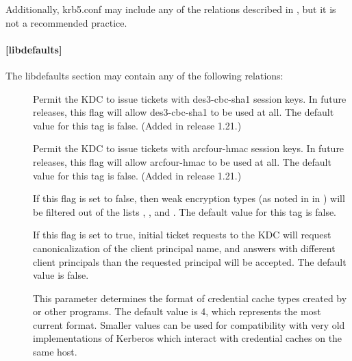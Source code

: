 \documentclass[letterpaper,10pt,english]{sphinxmanual}
\begin{document}
Additionally, krb5.conf may include any of the relations described in
{\hyperref[\detokenize{admin/conf_files/kdc_conf:kdc-conf-5}]{}}, but it is not a recommended practice.


\paragraph{{[}libdefaults{]}}
\label{\detokenize{admin/conf_files/krb5_conf:libdefaults}}\label{\detokenize{admin/conf_files/krb5_conf:id1}}
The libdefaults section may contain any of the following relations:
\begin{description}
\item[{}] \leavevmode
Permit the KDC to issue tickets with des3-cbc-sha1 session keys.
In future releases, this flag will allow des3-cbc-sha1 to be used
at all.  The default value for this tag is false.  (Added in
release 1.21.)

\item[{}] \leavevmode
Permit the KDC to issue tickets with arcfour-hmac session keys.
In future releases, this flag will allow arcfour-hmac to be used
at all.  The default value for this tag is false.  (Added in
release 1.21.)

\item[{}] \leavevmode
If this flag is set to false, then weak encryption types (as noted
in {\hyperref[\detokenize{admin/conf_files/kdc_conf:encryption-types}]{}} in {\hyperref[\detokenize{admin/conf_files/kdc_conf:kdc-conf-5}]{}}) will be filtered
out of the lists ,
, and .  The default
value for this tag is false.

\item[{}] \leavevmode
If this flag is set to true, initial ticket requests to the KDC
will request canonicalization of the client principal name, and
answers with different client principals than the requested
principal will be accepted.  The default value is false.

\item[{}] \leavevmode
This parameter determines the format of credential cache types
created by  or other programs.  The default value
is 4, which represents the most current format.  Smaller values
can be used for compatibility with very old implementations of
Kerberos which interact with credential caches on the same host.


\end{description}
\end{document}
